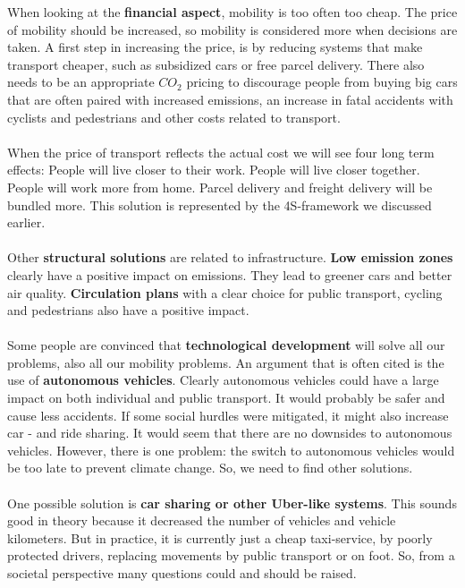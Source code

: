 \documentclass[../summary.tex]{subfiles}
\begin{document}
	When looking at the \textbf{financial aspect}, mobility is too often too cheap. The price of mobility should be increased, so mobility is considered more when decisions are taken. A first step in increasing the price, is by reducing systems that make transport cheaper, such as subsidized cars or free parcel delivery. There also needs to be an appropriate $CO_{2}$ pricing to discourage people from buying big cars that are often paired with increased emissions, an increase in fatal accidents with cyclists and pedestrians and other costs related to transport. 
	\\\\
	When the price of transport reflects the actual cost we will see four long term effects: People will live closer to their work. People will live closer together. People will work more from home. Parcel delivery and freight delivery will be bundled more. This solution is represented by the 4S-framework we discussed earlier. 
	\\\\
	Other \textbf{structural solutions} are related to infrastructure. \textbf{Low emission zones} clearly have a positive impact on emissions. They lead to greener cars and better air quality. \textbf{Circulation plans} with a clear choice for public transport, cycling and pedestrians also have a positive impact. 
	\\\\
	 Some people are convinced that \textbf{technological development} will solve all our problems, also all our mobility problems. An argument that is often  cited is the use of  \textbf{autonomous vehicles}. Clearly autonomous vehicles could have a large impact on both individual and public transport. It would probably be safer and cause less accidents. If some social hurdles were mitigated, it might also increase car - and ride sharing. It would seem that there are no downsides to autonomous vehicles. However, there is one problem: the switch to autonomous vehicles would be too late to prevent climate change. So, we need to find other solutions.
	 \\\\
	 One possible solution is \textbf{car sharing or other Uber-like systems}. This sounds good in theory because it decreased the number of vehicles 	and vehicle kilometers. But in practice, it is currently just a cheap taxi-service, by poorly protected drivers, replacing movements by public transport or on foot. So, from a societal perspective many questions could and should be raised.
	 \\\\
\end{document}
